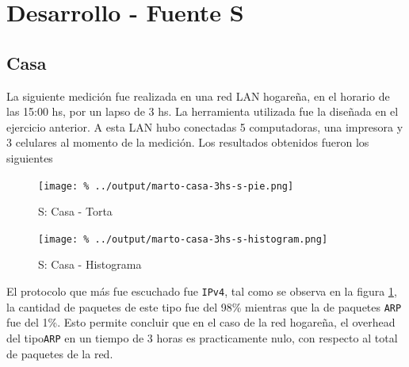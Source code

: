 \documentclass[final,inline,a4paper,narroweqnarray]{ieee}
\begin{document}
\section{Desarrollo - Fuente S}
  \subsection{Casa}

  La siguiente medición fue realizada en una red LAN hogareña, en el horario
  de las 15:00 hs, por un lapso de 3 hs. La herramienta utilizada fue la
  diseñada en el ejercicio anterior. A esta LAN hubo conectadas 5 computadoras,
  una impresora y 3 celulares al momento de la medición. Los resultados obtenidos
  fueron los siguientes


    \begin{figure}[ht]\begin{center}
      \texttt{[image: \%
      ../output/marto-casa-3hs-s-pie.png]}
      \vspace{-3em}
      \caption{S: Casa - Torta}
      \label{marto-casa-3hs-s-pie}
    \end{center}\end{figure}

    
    \begin{figure}[ht]\begin{center}
     \texttt{[image: \%
      ../output/marto-casa-3hs-s-histogram.png]}
      \caption{S: Casa - Histograma}
      \label{marto-casa-3hs-s-histogram}
    \end{center}\end{figure}

    El protocolo que más fue escuchado fue \texttt{IPv4}, tal como se
    observa en la figura \ref{marto-casa-3hs-s-pie}, la cantidad de
    paquetes  de este tipo fue del 98\% mientras que la de paquetes
    \texttt{ARP} fue del 1\%. Esto permite concluir que en el caso de
    la red hogareña, el overhead del tipo\texttt{ARP} en un tiempo
    de 3 horas es practicamente nulo, con respecto al total de
    paquetes de la red.
\end{document}

